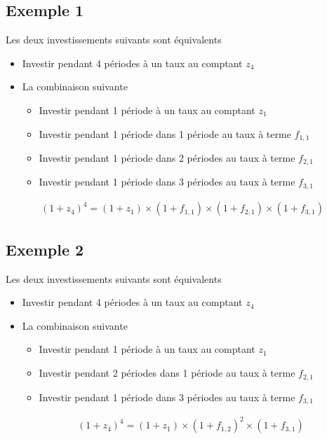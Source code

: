 \documentclass[12pt]{article}
\begin{document}
\subsection{Exemple 1}
Les deux investissements suivants sont équivalents
\begin{itemize}
\item Investir pendant 4 périodes à un taux au comptant $z_4$
\item La combinaison suivante
\begin{itemize}
\item Investir pendant 1 période à un taux au comptant $z_1$
\item Investir pendant 1 période dans 1 période au taux à terme $f_{1,1}$
\item Investir pendant 1 période dans 2 périodes au taux à terme $f_{2,1}$
\item Investir pendant 1 période dans 3 périodes au taux à terme $f_{3,1}$
\end{itemize}
\end{itemize}
\begin{align*}
(1+z_4)^4=(1+z_1) \times (1+f_{1,1}) \times (1+f_{2,1}) \times (1+f_{3,1})
\end{align*}


\subsection{Exemple 2}
Les deux investissements suivants sont équivalents
\begin{itemize}
\item Investir pendant 4 périodes à un taux au comptant $z_4$
\item La combinaison suivante
\begin{itemize}
\item Investir pendant 1 période à un taux au comptant $z_1$
\item Investir pendant 2 périodes dans 1 période au taux à terme $f_{2,1}$
\item Investir pendant 1 période dans 3 périodes au taux à terme $f_{3,1}$
\end{itemize}

\begin{align*}
(1+z_4)^4=(1+z_1) \times (1+f_{1,2})^2 \times (1+f_{3,1})
\end{align*}
\end{itemize}
\end{document}
